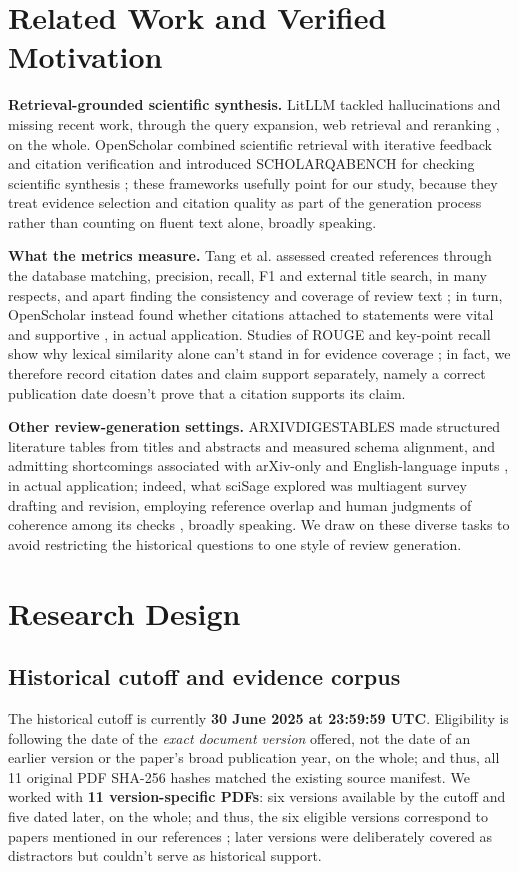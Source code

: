 \documentclass[12pt,a4paper]{article}
\begin{document}
\section{Related Work and Verified Motivation}
\textbf{Retrieval-grounded scientific synthesis.} LitLLM tackled hallucinations and missing recent work, through the query expansion, web retrieval and reranking \cite{agarwal2025}, on the whole. OpenScholar combined scientific retrieval with iterative feedback and citation verification and introduced SCHOLARQABENCH for checking scientific synthesis \cite{asai2024}; these frameworks usefully point for our study, because they treat evidence selection and citation quality as part of the generation process rather than counting on fluent text alone, broadly speaking.

\textbf{What the metrics measure.} Tang et al. assessed created references through the database matching, precision, recall, F1 and external title search, in many respects, and apart finding the consistency and coverage of review text \cite{tang2025}; in turn, OpenScholar instead found whether citations attached to statements were vital and supportive \cite{asai2024}, in actual application. Studies of ROUGE and key-point recall show why lexical similarity alone can't stand in for evidence coverage \cite{ali2024,tang2025}; in fact, we therefore record citation dates and claim support separately, namely a correct publication date doesn't prove that a citation supports its claim.

\textbf{Other review-generation settings.} ARXIVDIGESTABLES made structured literature tables from titles and abstracts and measured schema alignment, and admitting shortcomings associated with arXiv-only and English-language inputs \cite{newman2024}, in actual application; indeed, what sciSage explored was multiagent survey drafting and revision, employing reference overlap and human judgments of coherence among its checks \cite{shi2025}, broadly speaking. We draw on these diverse tasks to avoid restricting the historical questions to one style of review generation.

\section{Research Design}
\subsection{Historical cutoff and evidence corpus}
The historical cutoff is currently \textbf{30 June 2025 at 23:59:59 UTC}. Eligibility is following the date of the \emph{exact document version} offered, not the date of an earlier version or the paper's broad publication year, on the whole; and thus, all 11 original PDF SHA-256 hashes matched the existing source manifest. We worked with \textbf{11 version-specific PDFs}: six versions available by the cutoff and five dated later, on the whole; and thus, the six eligible versions correspond to papers mentioned in our references \cite{agarwal2025,newman2024,asai2024,ali2024,tang2025,shi2025}; later versions were deliberately covered as distractors but couldn't serve as historical support.
\end{document}
